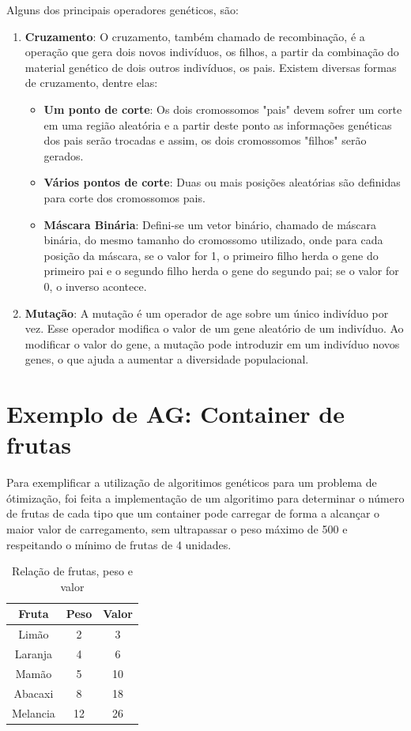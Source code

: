 \documentclass[12pt]{article}
\begin{document}
Alguns dos principais operadores genéticos, são:
\begin{enumerate}[\textbf{(i)}]
	\item \textbf{Cruzamento}: O cruzamento, também chamado de recombinação, é a operação que
		  gera dois novos indivíduos, os filhos, a partir da combinação do material genético
		  de dois outros indivíduos, os pais.
		  Existem diversas formas de cruzamento, dentre elas:
		  \begin{itemize}
			\item \textbf{Um ponto de corte}: Os dois cromossomos "pais" devem sofrer um corte
			em uma região aleatória e a partir deste ponto as informações genéticas dos pais
			serão trocadas e assim, os dois cromossomos "filhos" serão gerados.
			\item \textbf{Vários pontos de corte}: Duas ou mais posições aleatórias são
			definidas para corte dos cromossomos pais.
			\item \textbf{Máscara Binária}: Defini-se um vetor binário, chamado de máscara
			binária, do mesmo tamanho do cromossomo utilizado, onde para cada posição da
			máscara, se o valor for 1, o primeiro filho herda o gene do primeiro pai e o
			segundo filho herda o gene do segundo pai; se o valor for 0, o inverso acontece.
		  \end{itemize}
	\item \textbf{Mutação}: A mutação é um operador de age sobre um único indivíduo por vez.
		  Esse operador modifica o valor de um gene aleatório de um indivíduo. Ao modificar
		  o valor do gene, a mutação pode introduzir em um indivíduo novos genes, o que
		  ajuda a aumentar a diversidade populacional.

\end{enumerate}

\section{Exemplo de AG: Container de frutas}
Para exemplificar a utilização de algoritimos genéticos para um problema de ótimização, foi
feita a implementação de um algoritimo para determinar o número de frutas de cada tipo que um
container pode carregar de forma a alcançar o maior valor de carregamento, sem ultrapassar o
peso máximo de 500 e respeitando o mínimo de frutas de 4 unidades.

\begin{table}[ht]
	\centering
	\begin{tabular}{|c|c|c|}
		\hline
		\rowcolor{gray}
		Fruta & Peso & Valor \\ \hline
		 Limão & 2 & 3 \\ \hline
		 Laranja & 4 & 6 \\ \hline
		 Mamão & 5 & 10 \\ \hline
		 Abacaxi & 8 & 18 \\ \hline
		 Melancia & 12 & 26 \\ \hline
	\end{tabular}
	\caption{Relação de frutas, peso e valor\label{tb:container-de-fruta}}
\end{table}
\end{document}
